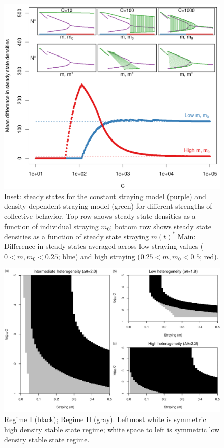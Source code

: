 \documentclass{revtex4}
\begin{document}
\begin{figure}
  \captionsetup{justification=raggedright,
singlelinecheck=false
}
\centering
\includegraphics[width=1\textwidth]{fig_meandiff.pdf}
\caption{
Inset: steady states for the constant straying model (purple) and density-dependent straying model (green) for different strengths of collective behavior.
Top row shows steady state densities as a function of individual straying $m_0$; bottom row shows steady state densities as a function of steady state straying $m(t)^*$
Main: Difference in steady states averaged across low straying values ($0 < m,m_0 < 0.25$; blue) and high straying ($0.25 < m,m_0 < 0.5$; red).
} \label{fig:cb}
\end{figure}


\begin{figure}
  \captionsetup{justification=raggedright,
singlelinecheck=false
}
\centering
\includegraphics[width=1\textwidth]{fig_hysteresis_ddm.pdf}
\caption{
Regime I (black); Regime II (gray). Leftmost white is symmetric high density stable state regime; white space to left is symmetric low density stable state regime. 
} \label{fig:bifurcationsddm}
\end{figure}
\end{document}
